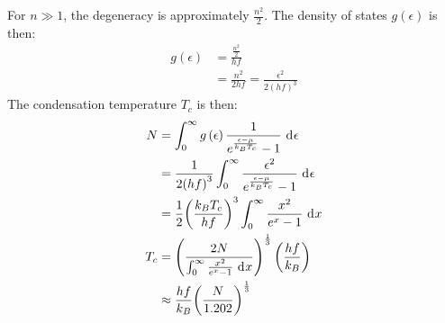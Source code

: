 \documentclass{article}
\begin{document}
\clearpage

\problem
{}
For $n \gg 1$, the degeneracy is approximately $\frac{n^2}{2}$. The density of states $g\left(\epsilon\right)$ is then:
\begin{equation}
    \begin{split}
        g\left(\epsilon\right) & = \frac{\frac{n^2}{2}}{hf} \\
        & = \frac{n^2}{2hf} = \frac{\epsilon^2}{2{\left(hf\right)}^3}
    \end{split}
\end{equation}
The condensation temperature $T_c$ is then:
\begin{equation}
    \begin{split}
        N & = \int_0^{\infty} g\left(\epsilon\right)\frac{1}{e^{\frac{\epsilon - \mu}{k_BT_c}} - 1} \, \diff{\epsilon} \\
        & = \frac{1}{2{\left(hf\right)}^3}\int_0^{\infty} \frac{\epsilon^2}{e^{\frac{\epsilon - \mu}{k_BT_c}} - 1} \, \diff{\epsilon} \\
        & = \frac{1}{2}{\left(\frac{k_BT_c}{hf}\right)}^3\int_0^{\infty} \frac{x^2}{e^x - 1} \, \diff{x} \\
        T_c & = {\left(\frac{2N}{\int_0^{\infty}\frac{x^2}{e^x - 1} \, \diff{x}}\right)}^{\frac{1}{3}}\left(\frac{hf}{k_B}\right) \\
        & \approx \frac{hf}{k_B}{\left(\frac{N}{1.202}\right)}^{\frac{1}{3}}
    \end{split}
\end{equation}
\end{document}
